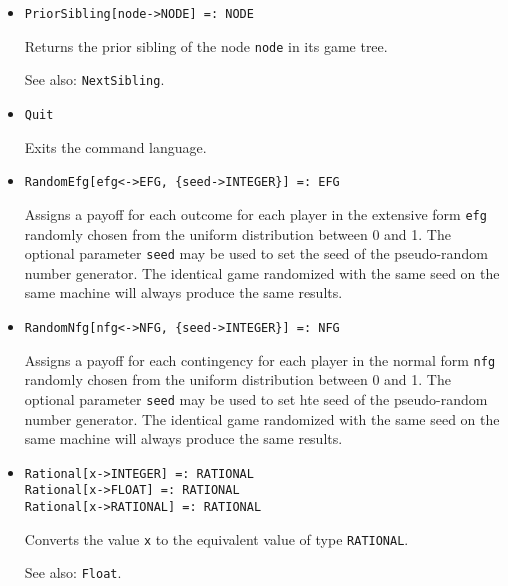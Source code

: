 \begin{itemize}
\item
\protect \large \begin{verbatim}
PriorSibling[node->NODE] =: NODE
\end{verbatim}\normalsize

\bd
Returns the prior sibling of the node \verb+node+ in its
game tree.
\item
[See also:] {\tt NextSibling}.
\ed




\item
\protect \large \begin{verbatim}
Quit
\end{verbatim}\normalsize

\bd
Exits the command language.
\ed


\item
\protect \large \begin{verbatim}
RandomEfg[efg<->EFG, {seed->INTEGER}] =: EFG
\end{verbatim}\normalsize

\bd
Assigns a payoff for each outcome for each player in the
extensive form \verb+efg+ randomly chosen from the uniform distribution
between 0 and 1.  The optional parameter \verb+seed+ may be used to
set the seed of the pseudo-random number generator.  The identical game
randomized with the same seed on the same machine will always produce
the same results.
\ed

\item
\protect \large \begin{verbatim}
RandomNfg[nfg<->NFG, {seed->INTEGER}] =: NFG
\end{verbatim}\normalsize

\bd
Assigns a payoff for each contingency for each player in
the normal form \verb+nfg+ randomly chosen from the uniform distribution
between 0 and 1.  The optional parameter \verb+seed+ may be used to
set hte seed of the pseudo-random number generator.  The identical game
randomized with the same seed on the same machine will always produce
the same results.
\ed

\item
\protect \large \begin{verbatim}
Rational[x->INTEGER] =: RATIONAL
Rational[x->FLOAT] =: RATIONAL
Rational[x->RATIONAL] =: RATIONAL
\end{verbatim} \normalsize

\bd
Converts the value \verb+x+ to the equivalent value of
type {\tt RATIONAL}.
\item
[See also:] {\tt Float}.
\ed


\end{itemize}
